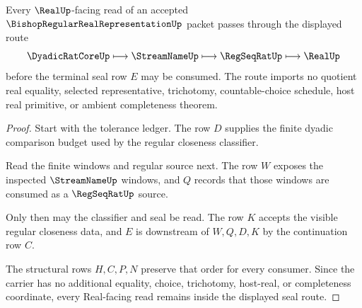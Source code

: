 \begin{theorem}
\label{thm:bishop-regular-real-representation-seal-route}
Every $\RealUp$-facing read of an accepted $\BishopRegularRealRepresentationUp$ packet passes through the displayed route
$$
\DyadicRatCoreUp \longmapsto \StreamNameUp \longmapsto \RegSeqRatUp \longmapsto \RealUp
$$
before the terminal seal row $E$ may be consumed. The route imports no quotient real equality, selected representative, trichotomy, countable-choice schedule, host real primitive, or ambient completeness theorem.
\end{theorem}
\begin{proof}
Start with the tolerance ledger. The row $D$ supplies the finite dyadic comparison budget used by the regular closeness classifier.

Read the finite windows and regular source next. The row $W$ exposes the inspected $\StreamNameUp$ windows, and $Q$ records that those windows are consumed as a $\RegSeqRatUp$ source.

Only then may the classifier and seal be read. The row $K$ accepts the visible regular closeness data, and $E$ is downstream of $W,Q,D,K$ by the continuation row $C$.

The structural rows $H,C,P,N$ preserve that order for every consumer. Since the carrier has no additional equality, choice, trichotomy, host-real, or completeness coordinate, every Real-facing read remains inside the displayed seal route.
\end{proof}




